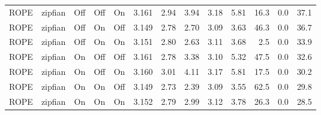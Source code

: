 \begin{longtable}{llcccrrrrrrrr}
ROPE & zipfian & Off & Off & On & 3.161 & 2.94 & 3.94 & 3.18 & 5.81 & 16.3 & 0.0 & 37.1 \\
ROPE & zipfian & Off & On & Off & 3.149 & 2.78 & 2.70 & 3.09 & 3.63 & 46.3 & 0.0 & 36.7 \\
ROPE & zipfian & Off & On & On & 3.151 & 2.80 & 2.63 & 3.11 & 3.68 & 2.5 & 0.0 & 33.9 \\
ROPE & zipfian & On & Off & Off & 3.161 & 2.78 & 3.38 & 3.10 & 5.32 & 47.5 & 0.0 & 32.6 \\
ROPE & zipfian & On & Off & On & 3.160 & 3.01 & 4.11 & 3.17 & 5.81 & 17.5 & 0.0 & 30.2 \\
ROPE & zipfian & On & On & Off & 3.149 & 2.73 & 2.39 & 3.09 & 3.55 & 62.5 & 0.0 & 29.8 \\
ROPE & zipfian & On & On & On & 3.152 & 2.79 & 2.99 & 3.12 & 3.78 & 26.3 & 0.0 & 28.5 \\
\end{longtable}
